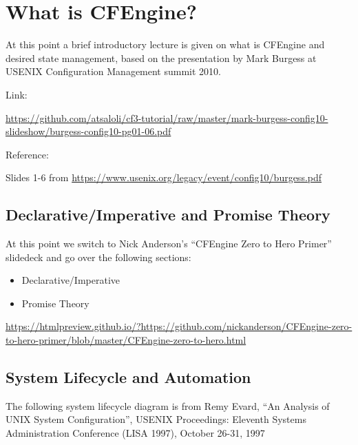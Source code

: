 \section{What is CFEngine?}

At this point a brief introductory lecture is given on what is CFEngine
and desired state management, based on the presentation by Mark Burgess
at USENIX Configuration Management summit 2010.

Link:

\href{https://github.com/atsaloli/cf3-tutorial/raw/master/mark-burgess-config10-slideshow/burgess-config10-pg01-06.pdf}{https://github.com/atsaloli/cf3-tutorial/raw/master/mark-burgess-config10-slideshow/burgess-config10-pg01-06.pdf}

Reference:

Slides 1-6 from \href{https://www.usenix.org/legacy/event/config10/burgess.pdf}{https://www.usenix.org/legacy/event/config10/burgess.pdf}





\subsection{Declarative/Imperative and Promise Theory}

At this point we switch to Nick Anderson's ``CFEngine Zero to Hero
Primer'' slidedeck and go over the following sections:

\begin{itemize}
\item{} Declarative/Imperative
\item{} Promise Theory
\end{itemize}

\href{https://htmlpreview.github.io/?https://github.com/nickanderson/CFEngine-zero-to-hero-primer/blob/master/CFEngine-zero-to-hero.html}{https://htmlpreview.github.io/?https://github.com/nickanderson/CFEngine-zero-to-hero-primer/blob/master/CFEngine-zero-to-hero.html}





\subsection{System Lifecycle and Automation}

The following system lifecycle diagram is from Remy Evard, ``An Analysis
of UNIX System Configuration'', USENIX Proceedings: Eleventh Systems
Administration Conference (LISA 1997), October 26-31, 1997

